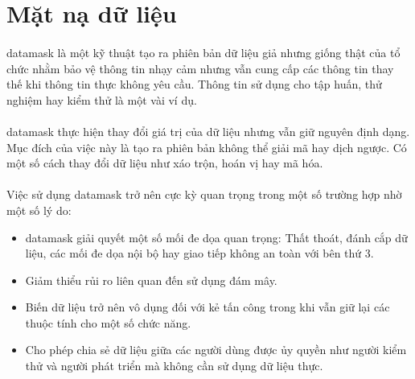 \section{Mặt nạ dữ liệu}

\paragraph{}
\Gls{datamask} là một kỹ thuật tạo ra phiên bản dữ liệu giả nhưng giống thật của tổ chức nhằm bảo vệ thông tin nhạy cảm nhưng vẫn cung cấp các thông tin thay thế khi thông tin thực không yêu cầu. Thông tin sử dụng cho tập huấn, thử nghiệm hay kiểm thử là một vài ví dụ.

\paragraph{}
\Gls{datamask} thực hiện thay đổi giá trị của dữ liệu nhưng vẫn giữ nguyên định dạng. Mục đích của việc này là tạo ra phiên bản không thể giải mã hay dịch ngược. Có một số cách thay đổi dữ liệu như xáo trộn, hoán vị hay mã hóa.

\paragraph{}
Việc sử dụng \gls{datamask} trở nên cực kỳ quan trọng trong một số trường hợp nhờ một số lý do:

\begin{itemize}
	\item \Gls{datamask} giải quyết một số mối đe dọa quan trọng: Thất thoát, đánh cắp dữ liệu, các mối đe dọa nội bộ hay giao tiếp không an toàn với bên thứ 3.
	\item Giảm thiểu rủi ro liên quan đến sử dụng đám mây.
	\item Biến dữ liệu trở nên vô dụng đối với kẻ tấn công trong khi vẫn giữ lại các thuộc tính cho một số chức năng.
	\item Cho phép chia sẻ dữ liệu giữa các người dùng được ủy quyền như người kiểm thử và người phát triển mà không cần sử dụng dữ liệu thực.
\end{itemize}

